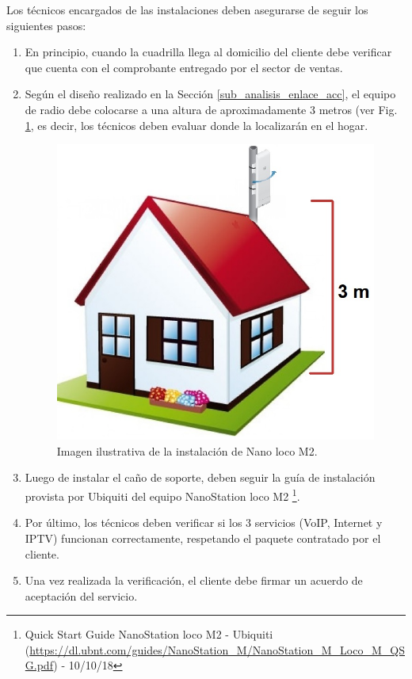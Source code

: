 \documentclass[12pt,a4paper]{book}
\begin{document}
\medskip

\noindent Los técnicos encargados de las instalaciones deben asegurarse de seguir los siguientes pasos:

\begin{enumerate}
\item En principio, cuando la cuadrilla llega al domicilio del cliente debe verificar que cuenta con el comprobante entregado por el sector de ventas.
\item Según el diseño realizado en la Sección \ref{sub_analisis_enlace_acc}, el equipo de radio debe colocarse a una altura de aproximadamente 3 metros (ver Fig. \ref{fig_instalacion_nanoloco_accion}, es decir, los técnicos deben evaluar donde la localizarán en el hogar.

\begin{figure}
\centering
\includegraphics[width= 8 cm]{../figuras/instalacion_nanoLoco.jpg}
\caption{Imagen ilustrativa de la instalación de Nano loco M2.}
\label{fig_instalacion_nanoloco_accion}
\end{figure}

\item Luego de instalar el caño de soporte, deben seguir la guía de instalación provista por Ubiquiti del equipo NanoStation loco M2 \footnote{Quick Start Guide NanoStation loco M2 - Ubiquiti (\url{https://dl.ubnt.com/guides/NanoStation_M/NanoStation_M_Loco_M_QSG.pdf}) - 10/10/18}.
\item Por último, los técnicos deben verificar si los 3 servicios (VoIP, Internet y IPTV) funcionan correctamente, respetando el paquete contratado por el cliente.
\item Una vez realizada la verificación, el cliente debe firmar un acuerdo de aceptación del servicio.
\end{enumerate}
\end{document}
